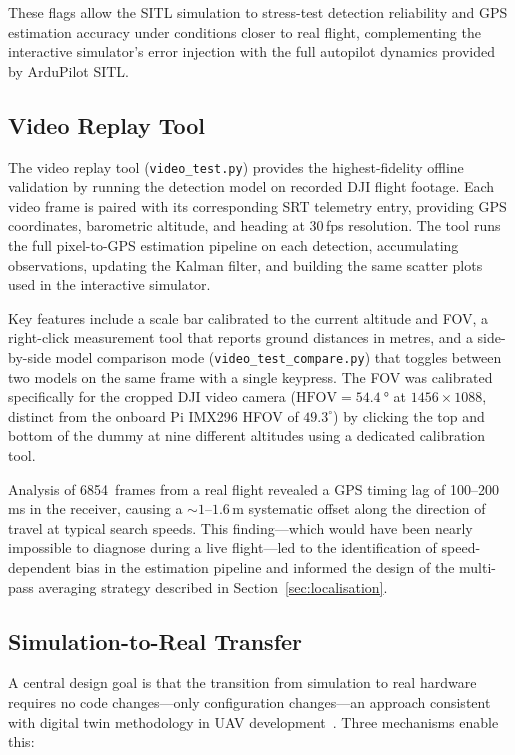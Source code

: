 \noindent These flags allow the SITL simulation to stress-test detection reliability and GPS estimation accuracy under conditions closer to real flight, complementing the interactive simulator's error injection with the full autopilot dynamics provided by ArduPilot SITL.

\subsection{Video Replay Tool}\label{sec:sim-video}

The video replay tool (\texttt{video\_test.py}) provides the highest-fidelity offline validation by running the detection model on recorded DJI flight footage. Each video frame is paired with its corresponding SRT telemetry entry, providing GPS coordinates, barometric altitude, and heading at 30\,fps resolution. The tool runs the full pixel-to-GPS estimation pipeline on each detection, accumulating observations, updating the Kalman filter, and building the same scatter plots used in the interactive simulator.

Key features include a scale bar calibrated to the current altitude and FOV, a right-click measurement tool that reports ground distances in metres, and a side-by-side model comparison mode (\texttt{video\_test\_compare.py}) that toggles between two models on the same frame with a single keypress. The FOV was calibrated specifically for the cropped DJI video camera ($\text{HFOV} = \SI{54.4}{\degree}$ at $1456 \times 1088$, distinct from the onboard Pi IMX296 HFOV of $49.3^{\circ}$) by clicking the top and bottom of the dummy at nine different altitudes using a dedicated calibration tool.

Analysis of 6854~frames from a real flight revealed a GPS timing lag of 100--200\,ms in the receiver, causing a ${\sim}1$--$1.6$\,m systematic offset along the direction of travel at typical search speeds. This finding---which would have been nearly impossible to diagnose during a live flight---led to the identification of speed-dependent bias in the estimation pipeline and informed the design of the multi-pass averaging strategy described in Section~\ref{sec:localisation}.

\subsection{Simulation-to-Real Transfer}\label{sec:sim-transfer}

A central design goal is that the transition from simulation to real hardware requires no code changes---only configuration changes---an approach consistent with digital twin methodology in UAV development~\cite{jones2020}. Three mechanisms enable this:

